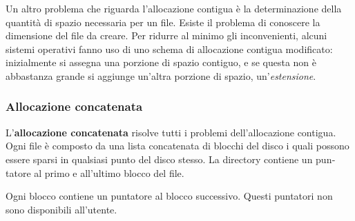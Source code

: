 \documentclass[11pt,a4paper]{article}
\begin{document}
{Un altro problema che riguarda l'allocazione contigua è la determinazione della quan­tità di spazio necessaria per un file. Esiste il problema di conoscere la dimensione del file da creare. Per ridurre al minimo gli inconvenienti, alcuni sistemi operativi fanno uso di uno
schema di allocazione contigua modificato: inizialmente si assegna una porzione di spazio
contiguo, e se questa non è abbastanza grande si aggiunge un'altra porzione di spazio,
un'\emph{estensione}.

\subsubsection{Allocazione concatenata}
L'\textbf{allocazione concatenata} risolve tutti i problemi dell'allocazione contigua. Ogni file è composto da una lista concatenata di blocchi del disco i quali possono essere sparsi in qualsiasi punto del disco stesso. La directory contiene un pun­tatore al primo e all'ultimo blocco del file.

Ogni blocco contiene un puntatore al blocco successivo.
Questi puntatori non sono disponibili all'utente.

}
\end{document}
